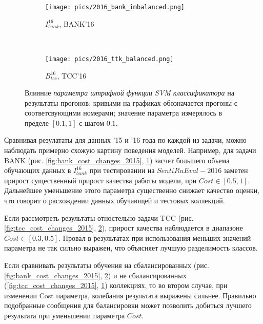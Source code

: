 \begin{figure}[!htp]
    \begin{subfigure}[b]{0.45\textwidth}
        \texttt{[image: pics/2016\_bank\_imbalanced.png]}
        \caption{$I_{bank}^{16}$, BANK'16}
        \label{fig:bank_cost_changes_2016}
    \end{subfigure}
    ~
    \begin{subfigure}[b]{0.45\textwidth}
        \texttt{[image: pics/2016\_ttk\_balanced.png]}
        \caption{$B_{tcc}^{16}$, TCC'16}
        \label{fig:tcc_cost_changes_2016}
    \end{subfigure}

    \caption{
        Влияние {\it параметра штрафной функции SVM классификатора}
        на результаты прогонов;
        кривыми на графиках обозначается прогоны с соответсвующими номерами;
        значение параметра измерялось в пределе $[0.1, 1]$ с шагом $0.1$.
    }
    \label{fig:cost}
\end{figure}

Сравнивая резулататы для данных '15 и '16 года по каждой из задачи, можно
наблюдать примерно схожую картину поведения моделей. Например, для задачи
BANK (рис. \ref{fig:bank_cost_changes_2015}, \ref{fig:bank_cost_changes_2016})
засчет большего объема обучающих данных в $I_{bank}^{16}$ при тестировании на
$SentiRuEval-2016$ заметен прирост существенный прирост качества работы модели,
при $Cost \in \left[0.5, 1\right]$.
Дальнейшее уменьшение этого параметра существенно снижает качество
оценки, что говорит о расхождении данных обучающей и тестовых коллекций.

Если рассмотреть результаты отностельно задачи TCC (рис.
\ref{fig:tcc_cost_changes_2015}, \ref{fig:tcc_cost_changes_2016}),
прирост качества наблюдается в диапазоне $Cost \in [0.3, 0.5]$.
Провал в результатах при использования меньших значений параметра
не так сильно выражен, что объясняет лучшую разделимость классов.

Если сравнивать результаты обучения на сбалансированных (рис.
\ref{fig:bank_cost_changes_2015}, \ref{fig:tcc_cost_changes_2016}) и не
сбалансированных (\ref{fig:tcc_cost_changes_2015}, \ref{fig:bank_cost_changes_2016})
коллекциях, то во втором случае, при изменении Cost параметра, колебания
результата выражены сильнее. Правильно подобранные сообщения для балансировки
может позволить добиться лучшего результата при уменьшении параметра $Cost$.
